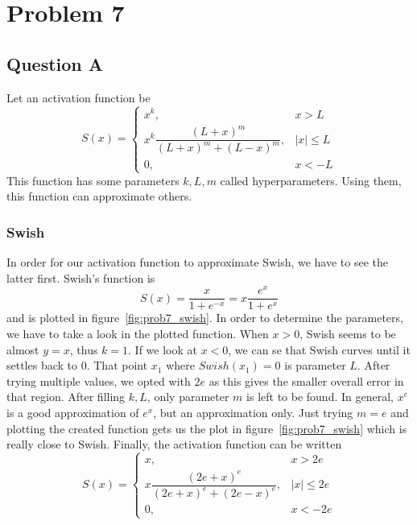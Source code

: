 \section{Problem 7}
\subsection{Question A}
Let an activation function be
\begin{equation}
S(x) = \left\{
\begin{array}{cc}
	x^k, & x>L\\[1mm]
	x^k \dfrac{\left(L+x\right)^m}{\left(L+x\right)^m + \left(L-x\right)^m}, & \left|x\right| \le L\\[1mm]
	0, & x < -L
\end{array}
\right.
\end{equation}
This function has some parameters $k,L,m$ called hyperparameters. Using them, this function can approximate others.

\subsubsection{Swish}
In order for our activation function to approximate Swish, we have to see the latter first.
Swish's function is 
\[
S(x) = \dfrac{x}{1+e^{-x}} = x\dfrac{e^x}{1+e^x}
\]
and is plotted in figure~\ref{fig:prob7_swish}. In order to determine the parameters, we have to take a look in the plotted function. When $x>0$, Swish seems to be almost $y=x$, thus $k=1$. If we look at $x<0$, we can se that Swish curves until it settles back to 0.
That point $x_1$ where $Swish (x_1) = 0$ is parameter $L$. After trying multiple values, we opted with $2e$ as this gives the smaller overall error in that region.
After filling $k,L$, only parameter $m$ is left to be found. In general, $x^e$ is a good approximation of $e^x$, but an approximation only. Just trying $m=e$ and plotting the created function gets us the plot in figure~\ref{fig:prob7_swish} which is really close to Swish.
Finally, the activation function can be written 
\[
S(x) = \left\{
\begin{array}{cc}
	x, & x>2e\\[1mm]
	x \dfrac{\left(2e+x\right)^e}{\left(2e+x\right)^e + \left(2e-x\right)^e}, & \left|x\right| \le 2e\\[1mm]
	0, & x < -2e
\end{array}
\right.
\]

